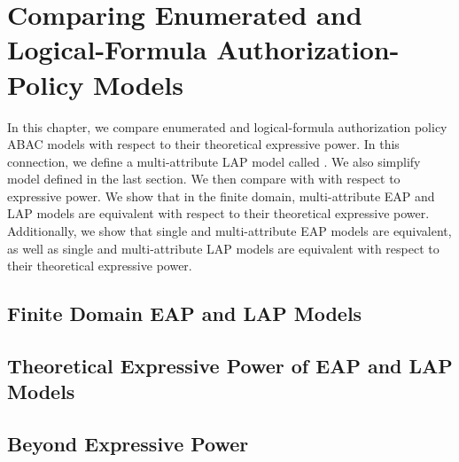 \chapter{Comparing Enumerated and Logical-Formula Authorization-Policy Models}
\label{sec:expresssive-power}
	In this chapter, we compare enumerated and logical-formula authorization policy ABAC models with respect to their theoretical expressive power. In this connection, we define a multi-attribute LAP model called \LPMN{}. We also simplify \EPMNModel{} model defined in the last section.  We then compare \EPMNModel{} with  \LPMN{} with respect to expressive power.  We show that in the finite domain, multi-attribute EAP and LAP models are equivalent with respect to their theoretical expressive power. Additionally, we show that single and multi-attribute EAP models are equivalent, as well as single and multi-attribute LAP models are equivalent with respect to their theoretical expressive power. 
	

\section{Finite Domain EAP and LAP Models}
	
\section{Theoretical Expressive Power of EAP and LAP Models}
	
\section{Beyond Expressive Power}
	